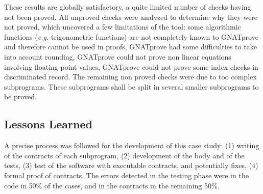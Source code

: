 \documentclass[10pt,a4paper,twocolumn]{article}
\newcommand{\gnatprove}{GNATprove\xspace}
\newcommand{\eg}{\textit{e.g.}\xspace}
\begin{document}
These results are globally satisfactory, a quite limited number of
checks having not been proved. All unproved checks were analyzed to
determine why they were not proved, which uncovered a few limitations
of the tool: some algorithmic functions (\eg trigonometric functions)
are not completely known to \gnatprove and therefore cannot be used in
proofs, \gnatprove had some difficulties to take into account
rounding,
\gnatprove could not prove non linear equations involving
floating-point values,
\gnatprove could not prove some index checks in discriminated record.
The remaining non proved checks were due to too complex subprograms.
These subprograms shall be split in several smaller subprograms to be
proved.


\subsection{Lessons Learned}

A precise process was followed for the development of this case study:
(1) writing of the contracts of each subprogram,
(2) development of the body and of the tests,
(3) test of the software with executable contracts, and potentially fixes,
(4) formal proof of contracts.
The errors detected in the testing phase were in the code
in 50\% of the cases, and in the contracts in the remaining 50\%.
\end{document}
